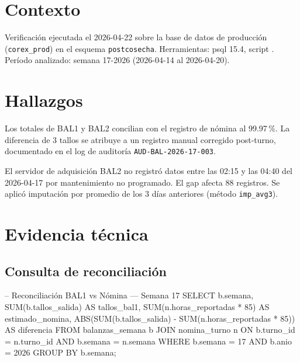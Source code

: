 \documentclass{../base/canon}
\begin{document}
\section{Contexto}

\begin{ParrafoMetodologico}
Verificación ejecutada el 2026-04-22 sobre la base de datos de producción
(\texttt{corex\_prod}) en el esquema \texttt{postcosecha}.
Herramientas: psql 15.4, script .
Período analizado: semana 17-2026 (2026-04-14 al 2026-04-20).
\end{ParrafoMetodologico}

\section{Hallazgos}

\begin{KeyFindingBox}
  Los totales de BAL1 y BAL2 concilian con el registro de nómina al 99.97\,\%.
  La diferencia de 3 tallos se atribuye a un registro manual corregido post-turno,
  documentado en el log de auditoría \texttt{AUD-BAL-2026-17-003}.
\end{KeyFindingBox}

\begin{WarningBox}
  El servidor de adquisición BAL2 no registró datos entre las 02:15 y las 04:40 del
  2026-04-17 por mantenimiento no programado.  El gap afecta 88 registros.
  Se aplicó imputación por promedio de los 3 días anteriores (método \texttt{imp\_avg3}).
\end{WarningBox}

\section{Evidencia técnica}

\subsection{Consulta de reconciliación}

\begin{CodeBlock}
-- Reconciliación BAL1 vs Nómina — Semana 17
SELECT
    b.semana,
    SUM(b.tallos_salida)         AS tallos_bal1,
    SUM(n.horas_reportadas * 85) AS estimado_nomina,
    ABS(SUM(b.tallos_salida)
      - SUM(n.horas_reportadas * 85)) AS diferencia
FROM balanzas_semana b
JOIN nomina_turno n
    ON b.turno_id = n.turno_id
    AND b.semana  = n.semana
WHERE b.semana = 17 AND b.anio = 2026
GROUP BY b.semana;
\end{CodeBlock}
\end{document}
